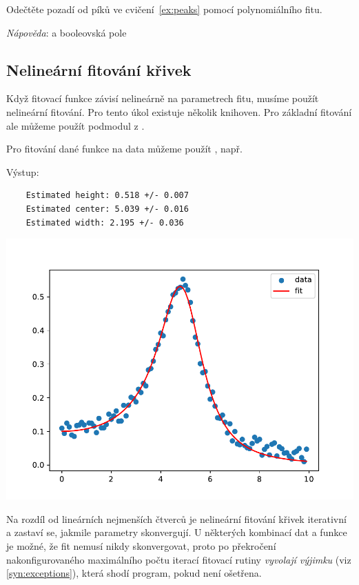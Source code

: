 \begin{exercise}
    Odečtěte pozadí od píků ve cvičení~\ref{ex:peaks} pomocí polynomiálního fitu.

    \emph{Nápověda}:  a booleovská pole
\end{exercise}

\subsection{Nelineární fitování křivek}
Když fitovací funkce závisí nelineárně na parametrech fitu, musíme použít nelineární fitování. Pro tento úkol existuje několik knihoven. Pro základní fitování ale můžeme použít podmodul  z .

Pro fitování dané funkce na data můžeme použít , např.

Výstup:
\begin{lstlisting}
    Estimated height: 0.518 +/- 0.007
    Estimated center: 5.039 +/- 0.016
    Estimated width: 2.195 +/- 0.036
\end{lstlisting}
\begin{center}
    \includegraphics[width=0.5\linewidth]{curve_fit.pdf}
\end{center}

Na rozdíl od lineárních nejmenších čtverců je nelineární fitování křivek iterativní a zastaví se, jakmile parametry skonvergují. U některých kombinací dat a funkce je možné, že fit nemusí nikdy skonvergovat, proto po překročení nakonfigurovaného maximálního počtu iterací fitovací rutiny \emph{vyvolají výjimku} (viz \ref{syn:exceptions}), která shodí program, pokud není ošetřena.

